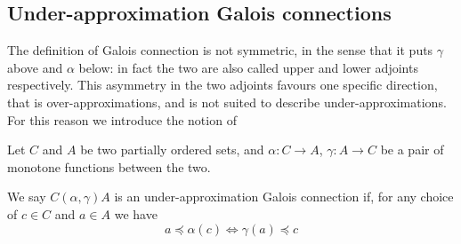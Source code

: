 \subsection{Under-approximation Galois connections}
The definition of Galois connection is not symmetric, in the sense that it puts $\gamma$ above and $\alpha$ below: in fact the two are also called upper and lower adjoints respectively. This asymmetry in the two adjoints favours one specific direction, that is over-approximations, and is not suited to describe under-approximations. For this reason we introduce the notion of
\begin{definition}\label{ch2:def:under-gc}
	Let $C$ and $A$ be two partially ordered sets, and $\alpha : C \rightarrow A$, $\gamma : A \rightarrow C$ be a pair of monotone functions between the two.

	We say $C (\alpha, \gamma) A$ is an under-approximation Galois connection if, for any choice of $c \in C$ and $a \in A$ we have
	\[
	a \preceq \alpha(c) \iff \gamma(a) \preceq c
	\]
\end{definition}

